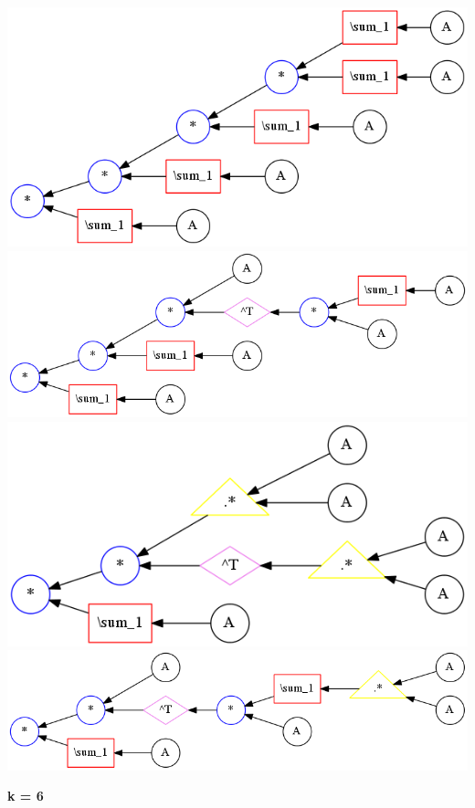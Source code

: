 \begin{center}
\includegraphics[width=0.45\linewidth]{trees/RBMOneSide_5_horizontal_0.png}
\includegraphics[width=0.45\linewidth]{trees/RBMOneSide_5_horizontal_1.png}
\includegraphics[width=0.45\linewidth]{trees/RBMOneSide_5_horizontal_2.png}
\includegraphics[width=0.45\linewidth]{trees/RBMOneSide_5_horizontal_3.png}
\end{center}


{\bf k = 6}



